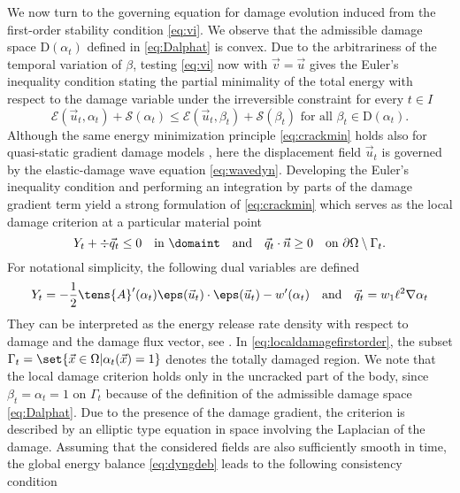 We now turn to the governing equation for damage evolution induced from the first-order stability condition \eqref{eq:vi}. We observe that the admissible damage space $\mathrm{D}(\alpha_t)$ defined in \eqref{eq:Dalphat} is convex. Due to the arbitrariness of the temporal variation of $\beta$, testing \eqref{eq:vi} now with $\vec{v}=\vec{u}$ gives the Euler's inequality condition stating the partial minimality of the total energy with respect to the damage variable under the irreversible constraint for every $t\in I$
\begin{equation} \label{eq:crackmin}
\mathcal{E}(\vec{u}_t,\alpha_t)+\mathcal{S}(\alpha_t)\leq\mathcal{E}(\vec{u}_t,\beta_t)+\mathcal{S}(\beta_t)\text{ for all $\beta_t\in\mathrm{D}(\alpha_t)$}.
\end{equation}
Although the same energy minimization principle \eqref{eq:crackmin} holds also for quasi-static gradient damage models \cite{PhamAmorMarigoMaurini:2011}, here the displacement field $\vec{u}_t$ is governed by the elastic-damage wave equation \eqref{eq:wavedyn}. Developing the Euler's inequality condition and performing an integration by parts of the damage gradient term yield a strong formulation of \eqref{eq:crackmin} which serves as the local damage criterion at a particular material point
\begin{equation} \label{eq:localdamagefirstorder}
Y_t+\div\vec{q}_t\leq 0\quad\text{in }\domaint\quad\text{and}\quad\vec{q}_t\cdot\vec{n}\geq 0\quad\text{on }\partial\Omega\setminus\Gamma_t.
\end{equation}
For notational simplicity, the following dual variables are defined
\begin{equation} \label{eq:Ytqt}
Y_t=-\frac{1}{2}\tens{A}'(\alpha_t)\eps(\vec{u}_t)\cdot\eps(\vec{u}_t)-w'(\alpha_t)\quad\text{and}\quad\vec{q}_t=w_1\ell^2\nabla\alpha_t
\end{equation}
They can be interpreted as the energy release rate density with respect to damage and the damage flux vector, see \cite{SicsicMarigo:2013}. In \eqref{eq:localdamagefirstorder}, the subset $\Gamma_t=\set{\vec{x}\in\Omega|\alpha_t(\vec{x})=1}$ denotes the totally damaged region. We note that the local damage criterion holds only in the uncracked part of the body, since $\beta_t=\alpha_t=1$ on $\Gamma_t$ because of the definition of the admissible damage space \eqref{eq:Dalphat}. Due to the presence of the damage gradient, the criterion is described by an elliptic type equation in space involving the Laplacian of the damage. Assuming that the considered fields are also sufficiently smooth in time, the global energy balance \eqref{eq:dyngdeb} leads to the following consistency condition
